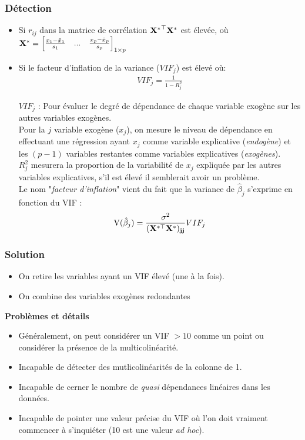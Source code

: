 \documentclass[10pt, french]{article}
\begin{document}
\begin{multicols*}{3}
\subsubsection*{Détection}
\begin{itemize}
\item Si $r_{ij}$ dans la matrice de corrélation $\mathbf{{X^*}^\top X^*}$ est élevée, où $\mathbf{X^*} = \begin{bmatrix}
\frac{x_1 - \bar{x}_1}{s_1} & ... & \frac{x_p - \bar{x}_p}{s_p}
\end{bmatrix}_{1 \times p}$
\item Si le facteur d'inflation de la variance ($VIF_j$) est élevé où:
\begin{align*}
VIF_j = \frac{1}{1 - R_j^2}
\end{align*}
\item[$VIF_j$ :] Pour évaluer le degré de dépendance de chaque variable exogène sur les autres variables exogènes.\\
Pour la $j$ variable exogène ($x_j$), on mesure le niveau de dépendance en effectuant une régression ayant $x_j$ comme variable explicative (\textit{endogène}) et les $(p - 1)$ variables restantes comme variables explicatives (\textit{exogènes}).\\
$R_j^2$ mesurera la proportion de la variabilité de $x_j$ expliquée par les autres variables explicatives, s'il est élevé il semblerait avoir un problème.\\
Le nom "\textit{facteur d'inflation}" vient du fait que la variance de $\hat{\beta}_j$ s'exprime en fonction du VIF :
\begin{align*}
	\text{V}(\hat{\beta}_j) = \frac{\sigma^2}{(\mathbf{X^{*\top} \mathbf{X^*})_{jj}}} VIF_j
\end{align*}
\end{itemize}

\subsubsection*{Solution}
\begin{itemize}
	\item On retire les variables ayant un VIF élevé (une à la fois).
	\item On combine des variables exogènes redondantes	
\end{itemize}

\textbf{Problèmes et détails}
\begin{itemize}
	\item Généralement, on peut considérer un VIF $> 10$ comme un point ou considérer la présence de la multicolinéarité.
	\item Incapable de détecter des mutlicolinéarités de la colonne de 1.
	\item Incapable de cerner le nombre de \textit{quasi} dépendances linéaires dans les données.
	\item Incapable de pointer une valeur précise du VIF où l'on doit vraiment commencer à s'inquiéter (10 est une valeur \textit{ad hoc}).
\end{itemize}


\end{multicols*}
\end{document}
